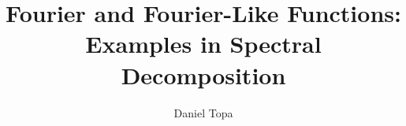 \documentclass[10pt, oneside]{article}   	%
\title{Fourier and Fourier-Like Functions:\\Examples in Spectral Decomposition}
\author{Daniel Topa\\\TopaHIIEmail}
\affil{\missiontech}
\begin{document}
\maketitle
	
\tableofcontents
		
		
			
\nocite{*}
\printbibliography
	
\end{document}
